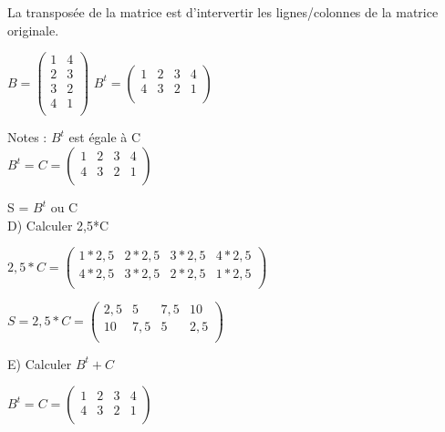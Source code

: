 \vspace{4mm} %
La transposée de la matrice est d'intervertir les lignes/colonnes de la matrice originale.

\vspace{5mm} %
$
B =
\begin{pmatrix}
  1 & 4 \\
  2 & 3 \\
  3 & 2 \\
  4 & 1 \\
\end{pmatrix}
$
\vspace{5mm} %
$
B^{t} =
\begin{pmatrix}
  1 & 2 & 3 & 4 \\
  4 & 3 & 2 & 1 \\
\end{pmatrix}
$

Notes : $B^{t}$ est égale à C \\

$
B^{t} = C =
\begin{pmatrix}
  1 & 2 & 3 & 4 \\
  4 & 3 & 2 & 1 \\
\end{pmatrix}
$

\vspace{5mm} %

S = $B^{t}$ ou C\\

\vspace{10mm} %
D) Calculer 2,5*C

\vspace{5mm} %
$
2,5*C =
\begin{pmatrix}
  1*2,5 & 2*2,5 & 3*2,5 & 4*2,5 \\
  4*2,5 & 3*2,5 & 2*2,5 & 1*2,5 \\
\end{pmatrix}
$
\vspace{5mm} %

$
S = 2,5*C =
\begin{pmatrix}
  2,5 & 5 & 7,5 & 10 \\
  10 & 7,5 & 5 & 2,5 \\
\end{pmatrix}
$


\vspace{10mm} %
E) Calculer $B^{t} + C$

\vspace{5mm} %
$
B^{t} = C =
\begin{pmatrix}
  1 & 2 & 3 & 4 \\
  4 & 3 & 2 & 1 \\
\end{pmatrix}
$
\vspace{5mm} %

